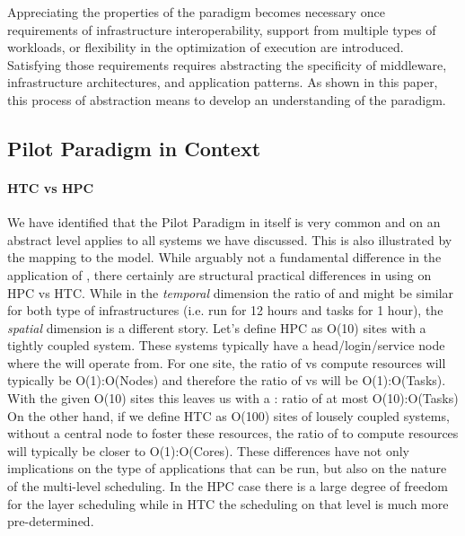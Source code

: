 \documentclass{sig-alternate}
\begin{document}
Appreciating the properties of the \pilot paradigm becomes necessary once
requirements of infrastructure interoperability, support from multiple types of
workloads, or flexibility in the optimization of execution are introduced.
Satisfying those requirements requires abstracting the specificity of
middleware, infrastructure architectures, and application patterns. As shown in
this paper, this process of abstraction means to develop an understanding of
the \pilot paradigm.


%
\subsection{Pilot Paradigm in Context}
\label{sec:context}

\paragraph*{HTC vs HPC} We have identified that the Pilot Paradigm in itself is
very common and on an abstract level applies to all \pilot systems we have
discussed. This is also illustrated by the mapping to the \pstar model.
While arguably not a fundamental difference in the application of \pilots,
there certainly are structural practical differences in using \pilots on HPC vs
HTC.
While in the \textit{temporal} dimension the ratio of  and \pilots might
be similar for both type of infrastructures (i.e. \pilots run for 12 hours and
tasks for 1 hour), the \textit{spatial} dimension is a different story.
Let's define HPC as O(10) sites with a tightly coupled system.
These systems typically have a head/login/service node where the \pilot will
operate from.
For one site, the ratio of \pilots vs compute resources will typically be
O(1):O(Nodes) and therefore the ratio of \pilots vs  will be
O(1):O(Tasks).
With the given O(10) sites this leaves us with a \pilot: ratio of at most
O(10):O(Tasks)
On the other hand, if we define HTC as O(100) sites of lousely coupled systems,
without a central node to foster these resources, the ratio of \pilots to
compute resources will typically be closer to O(1):O(Cores).
These differences have not only implications on the type of applications that
can be run, but also on the nature of the multi-level scheduling. In the HPC
case there is a large degree of freedom for the \pilot layer scheduling while
in HTC the scheduling on that level is much more pre-determined.
\end{document}
